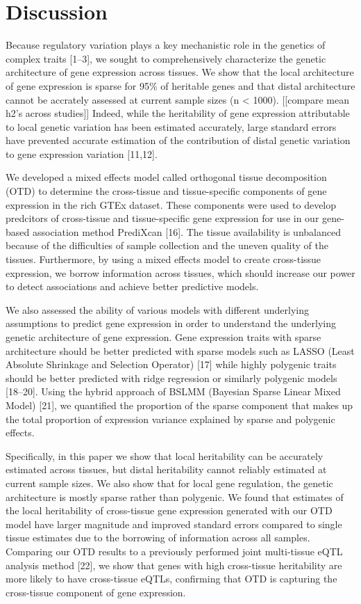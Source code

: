 \documentclass[]{article}
\begin{document}
\section{Discussion}\label{discussion}

Because regulatory variation plays a key mechanistic role in the
genetics of complex traits {[}1--3{]}, we sought to comprehensively
characterize the genetic architecture of gene expression across tissues.
We show that the local architecture of gene expression is sparse for
95\% of heritable genes and that distal architecture cannot be accrately
assessed at current sample sizes (n \textless{} 1000). {[}{[}compare
mean h2's across studies{]}{]} Indeed, while the heritability of gene
expression attributable to local genetic variation has been estimated
accurately, large standard errors have prevented accurate estimation of
the contribution of distal genetic variation to gene expression
variation {[}11,12{]}.

We developed a mixed effects model called orthogonal tissue
decomposition (OTD) to determine the cross-tissue and tissue-specific
components of gene expression in the rich GTEx dataset. These components
were used to develop predcitors of cross-tissue and tissue-specific gene
expression for use in our gene-based association method PrediXcan
{[}16{]}. The tissue availability is unbalanced because of the
difficulties of sample collection and the uneven quality of the tissues.
Furthermore, by using a mixed effects model to create cross-tissue
expression, we borrow information across tissues, which should increase
our power to detect associations and achieve better predictive models.

We also assessed the ability of various models with different underlying
assumptions to predict gene expression in order to understand the
underlying genetic architecture of gene expression. Gene expression
traits with sparse architecture should be better predicted with sparse
models such as LASSO (Least Absolute Shrinkage and Selection Operator)
{[}17{]} while highly polygenic traits should be better predicted with
ridge regression or similarly polygenic models {[}18--20{]}. Using the
hybrid approach of BSLMM (Bayesian Sparse Linear Mixed Model) {[}21{]},
we quantified the proportion of the sparse component that makes up the
total proportion of expression variance explained by sparse and
polygenic effects.

Specifically, in this paper we show that local heritability can be
accurately estimated across tissues, but distal heritability cannot
reliably estimated at current sample sizes. We also show that for local
gene regulation, the genetic architecture is mostly sparse rather than
polygenic. We found that estimates of the local heritability of
cross-tissue gene expression generated with our OTD model have larger
magnitude and improved standard errors compared to single tissue
estimates due to the borrowing of information across all samples.
Comparing our OTD results to a previously performed joint multi-tissue
eQTL analysis method {[}22{]}, we show that genes with high cross-tissue
heritability are more likely to have cross-tissue eQTLs, confirming that
OTD is capturing the cross-tissue component of gene expression.
\end{document}
